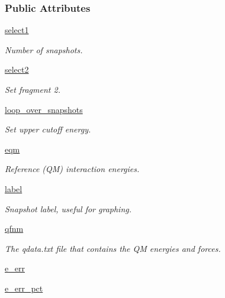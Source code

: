 \subsubsection*{Public Attributes}
\begin{DoxyCompactItemize}
\item 
\hyperlink{classsrc_1_1interaction_1_1Interaction_a63eb069ad104da75714f27b0d7a7a3d0}{select1}
\begin{DoxyCompactList}\small\item\em Number of snapshots. \end{DoxyCompactList}\item 
\hyperlink{classsrc_1_1interaction_1_1Interaction_ae1076300eeaacf9a332d271ccc649c42}{select2}
\begin{DoxyCompactList}\small\item\em Set fragment 2. \end{DoxyCompactList}\item 
\hyperlink{classsrc_1_1interaction_1_1Interaction_a1410b7854f7d2d4758eefd757798873f}{loop\+\_\+over\+\_\+snapshots}
\begin{DoxyCompactList}\small\item\em Set upper cutoff energy. \end{DoxyCompactList}\item 
\hyperlink{classsrc_1_1interaction_1_1Interaction_a434998fff4f973ce1bd9d026e121a6f1}{eqm}
\begin{DoxyCompactList}\small\item\em Reference (QM) interaction energies. \end{DoxyCompactList}\item 
\hyperlink{classsrc_1_1interaction_1_1Interaction_acba080f3210608be3ce74ec1d747f502}{label}
\begin{DoxyCompactList}\small\item\em Snapshot label, useful for graphing. \end{DoxyCompactList}\item 
\hyperlink{classsrc_1_1interaction_1_1Interaction_a52e371922894f77fe7cff07fe89dc2fe}{qfnm}
\begin{DoxyCompactList}\small\item\em The qdata.\+txt file that contains the QM energies and forces. \end{DoxyCompactList}\item 
\hyperlink{classsrc_1_1interaction_1_1Interaction_a35ee5459733d0fb42f07db599a50aecd}{e\+\_\+err}
\item 
\hyperlink{classsrc_1_1interaction_1_1Interaction_afa9f16852bba9e0fbb00287f6a6a0bbd}{e\+\_\+err\+\_\+pct}

\end{DoxyCompactItemize}
